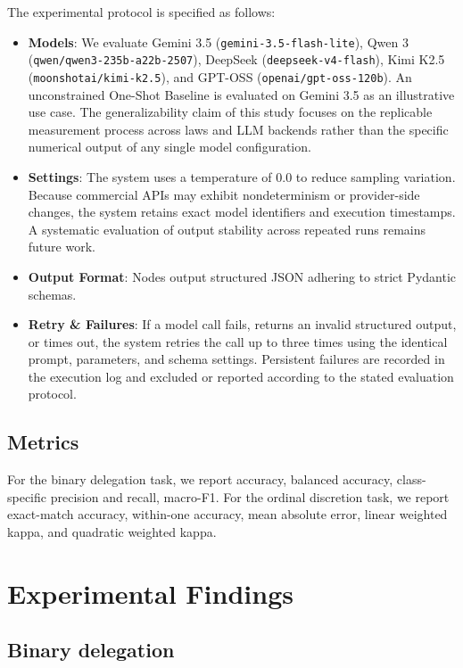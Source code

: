 \documentclass[runningheads]{llncs}
\begin{document}
The experimental protocol is specified as follows:
\begin{itemize}[nosep]
    \raggedright
    \item \textbf{Models}: We evaluate Gemini 3.5 (\texttt{gemini-3.5-flash-lite}), Qwen 3 (\texttt{qwen/qwen3-235b-a22b-2507}), DeepSeek (\texttt{deepseek-v4-flash}), Kimi K2.5 (\texttt{moonshotai/kimi-k2.5}), and GPT-OSS (\texttt{openai/gpt-oss-120b}). An unconstrained One-Shot Baseline is evaluated on Gemini 3.5 as an illustrative use case. The generalizability claim of this study focuses on the replicable measurement process across laws and LLM backends rather than the specific numerical output of any single model configuration.
    \item \textbf{Settings}: The system uses a temperature of 0.0 to reduce sampling variation. Because commercial APIs may exhibit nondeterminism or provider-side changes, the system retains exact model identifiers and execution timestamps. A systematic evaluation of output stability across repeated runs remains future work.
    \item \textbf{Output Format}: Nodes output structured JSON adhering to strict Pydantic schemas.
    \item \textbf{Retry \& Failures}: If a model call fails, returns an invalid structured output, or times out, the system retries the call up to three times using the identical prompt, parameters, and schema settings. Persistent failures are recorded in the execution log and excluded or reported according to the stated evaluation protocol.
\end{itemize}


\subsection{Metrics}

For the binary delegation task, we report accuracy, balanced accuracy, class-specific precision and recall, macro-F1. For the ordinal discretion task, we report exact-match accuracy, within-one accuracy, mean absolute error, linear weighted kappa, and quadratic weighted kappa.

\section{Experimental Findings}

\subsection{Binary delegation}
\end{document}
